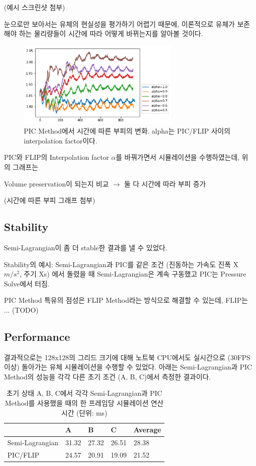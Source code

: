 \documentclass[10pt, A4]{article}
\begin{document}
(예시 스크린샷 첨부)

눈으로만 보아서는 유체의 현실성을 평가하기 어렵기 때문에, 이론적으로 유체가 보존해야 하는 물리량들이 시간에 따라 어떻게 바뀌는지를 알아볼 것이다.

\begin{figure}[h]
  \centering
  \includegraphics[width=0.7\textwidth]{picflip-volume-graph}
  \caption{PIC Method에서 시간에 따른 부피의 변화. alpha는 PIC/FLIP 사이의 interpolation factor이다.}
\end{figure}

PIC와 FLIP의 Interpolation factor $\alpha$를 바꿔가면서 시뮬레이션을 수행하였는데, 위의 그래프는 

Volume preservation이 되는지 비교 $\rightarrow$ 둘 다 시간에 따라 부피 증가

(시간에 따른 부피 그래프 첨부)

\subsection{Stability}

Semi-Lagrangian이 좀 더 stable한 결과를 낼 수 있었다.

Stability의 예시: Semi-Lagrangian과 PIC를 같은 조건 (진동하는 가속도 진폭 X$m/s^2$, 주기 Xs) 에서 돌렸을 때 Semi-Lagrangian은 계속 구동했고 PIC는 Pressure Solve에서 터짐.
 
PIC Method 특유의 점성은 FLIP Method라는 방식으로 해결할 수 있는데\cite{flip-fluids}, FLIP는 ... (TODO)

\subsection{Performance}

결과적으로는 128x128의 그리드 크기에 대해 노트북 CPU에서도 실시간으로 (30FPS 이상) 돌아가는 유체 시뮬레이션을 수행할 수 있었다. 아래는 Semi-Lagrangian과 PIC Method의 성능을 각각 다른 초기 조건 (A, B, C)에서 측정한 결과이다. 

\begin{table}[h]
\centering
\begin{tabular}{|l|l|l|l|l|}
\hline
                & A     & B     & C     & Average \\ \hline
Semi-Lagrangian & 31.32 & 27.32 & 26.51 & 28.38   \\ \hline
PIC/FLIP        & 24.57 & 20.91 & 19.09 & 21.52   \\ \hline
\end{tabular}
  \caption{초기 상태 A, B, C에서 각각 Semi-Lagrangian과 PIC Method를 사용했을 때의 한 프레임당 시뮬레이션 연산 시간 (단위: ms)}
\end{table}
\end{document}
